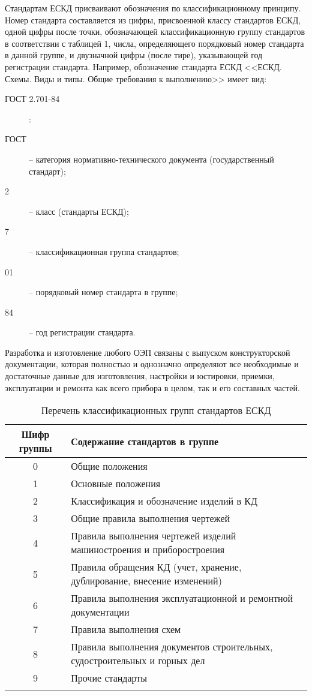 Стандартам ЕСКД присваивают обозначения по классификационному принципу. Номер стандарта составляется из цифры, присвоенной классу стандартов ЕСКД, одной цифры после точки, обозначающей классификационную группу стандартов в соответствии с таблицей 1, числа, определяющего порядковый номер стандарта в данной группе, и двузначной цифры (после тире), указывающей год регистрации стандарта. Например, обозначение стандарта ЕСКД <<ЕСКД. Схемы. Виды и типы. Общие требования к выполнению>> имеет вид:
\begin{description}
	\item[ГОСТ 2.701-84]:
	\item[ГОСТ] -- категория нормативно-технического документа (государственный стандарт);
	\item[2] -- класс (стандарты ЕСКД);
	\item[7] -- классификационная группа стандартов; 
	\item[01] -- порядковый номер стандарта в группе; 
	\item[84] -- год регистрации стандарта.
\end{description}

Разработка и изготовление любого ОЭП связаны с выпуском конструкторской документации, которая полностью и однозначно определяют все необходимые и достаточные данные для изготовления, настройки и юстировки, приемки, эксплуатации и ремонта как всего прибора в целом, так и его составных частей.

\begin{table*}[ht]
	\selectfont
	\begin{tabular}{cl} \hline 
		\toprule
		Шифр группы & Содержание стандартов в группе \\
		\midrule
		0 & Общие положения \\
		1 & Основные положения \\
		2 & Классификация и обозначение изделий в КД \\
		3 & Общие правила выполнения чертежей \\
		4 & Правила выполнения чертежей изделий машиностроения и приборостроения \\
		5 & Правила обращения КД (учет, хранение, дублирование, внесение изменений) \\
		6 & Правила выполнения эксплуатационной и ремонтной документации \\
		7 & Правила выполнения схем \\
		8 & Правила выполнения документов строительных, судостроительных и горных дел \\
		9 & Прочие стандарты \\
		\bottomrule \\
	\end{tabular}
	\label{tab:standart}
	\caption{Перечень классификационных групп стандартов ЕСКД}
\end{table*}

